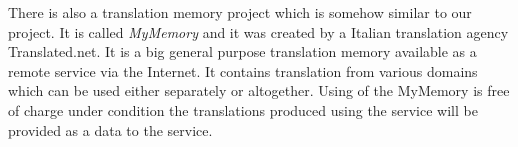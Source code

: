 There is also a translation memory project which is somehow similar to our project. It is called \emph{MyMemory} and it was created by a Italian translation agency Translated.net. It is a big general purpose translation memory available as a remote service via the Internet. It contains translation from various domains which can be used either separately or altogether. Using of the MyMemory is free of charge under condition the translations produced using the service will be provided as a data to the service.